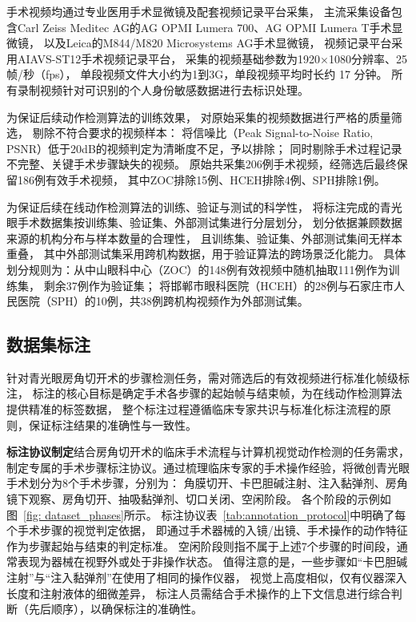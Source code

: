 手术视频均通过专业医用手术显微镜及配套视频记录平台采集，
主流采集设备包含Carl Zeiss Meditec AG的AG OPMI Lumera 700、AG OPMI Lumera T手术显微镜，
以及Leica的M844/M820 Microsystems AG手术显微镜，
视频记录平台采用AIAVS-ST12手术视频记录平台，
采集的视频基础参数为1920×1080分辨率、25帧/秒（fps），
单段视频文件大小约为1到3G，单段视频平均时长约 17 分钟。
所有录制视频针对可识别的个人身份敏感数据进行去标识处理。

为保证后续动作检测算法的训练效果，
对原始采集的视频数据进行严格的质量筛选，
剔除不符合要求的视频样本：
将信噪比（Peak Signal-to-Noise Ratio, PSNR）低于20dB的视频判定为清晰度不足，予以排除；
同时剔除手术过程记录不完整、关键手术步骤缺失的视频。
原始共采集206例手术视频，经筛选后最终保留186例有效手术视频，
其中ZOC排除15例、HCEH排除4例、SPH排除1例。

为保证后续在线动作检测算法的训练、验证与测试的科学性，
将标注完成的青光眼手术数据集按训练集、验证集、外部测试集进行分层划分，
划分依据兼顾数据来源的机构分布与样本数量的合理性，
且训练集、验证集、外部测试集间无样本重叠，
其中外部测试集采用跨机构数据，用于验证算法的跨场景泛化能力。
具体划分规则为：从中山眼科中心（ZOC）的148例有效视频中随机抽取111例作为训练集，
剩余37例作为验证集；
将邯郸市眼科医院（HCEH）的28例与石家庄市人民医院（SPH）的10例，共38例跨机构视频作为外部测试集。

\subsection{数据集标注}
针对青光眼房角切开术的步骤检测任务，需对筛选后的有效视频进行标准化帧级标注，
标注的核心目标是确定手术各步骤的起始帧与结束帧，为在线动作检测算法提供精准的标签数据，
整个标注过程遵循临床专家共识与标准化标注流程的原则，保证标注结果的准确性与一致性。

\textbf{标注协议制定}\quad 结合房角切开术的临床手术流程与计算机视觉动作检测的任务需求，
制定专属的手术步骤标注协议。通过梳理临床专家的手术操作经验，将微创青光眼手术划分为8个手术步骤，分别为：
角膜切开、卡巴胆碱注射、注入黏弹剂、房角镜下观察、房角切开、抽吸黏弹剂、切口关闭、空闲阶段。
各个阶段的示例如图~\ref{fig: dataset_phases}所示。
标注协议表~\ref{tab:annotation_protocol}中明确了每个手术步骤的视觉判定依据，
即通过手术器械的入镜/出镜、手术操作的动作特征作为步骤起始与结束的判定标准。
空闲阶段则指不属于上述7个步骤的时间段，通常表现为器械在视野外或处于非操作状态。
值得注意的是，一些步骤如“卡巴胆碱注射”与“注入黏弹剂”在使用了相同的操作仪器，
视觉上高度相似，仅有仪器深入长度和注射液体的细微差异，
标注人员需结合手术操作的上下文信息进行综合判断（先后顺序），以确保标注的准确性。

